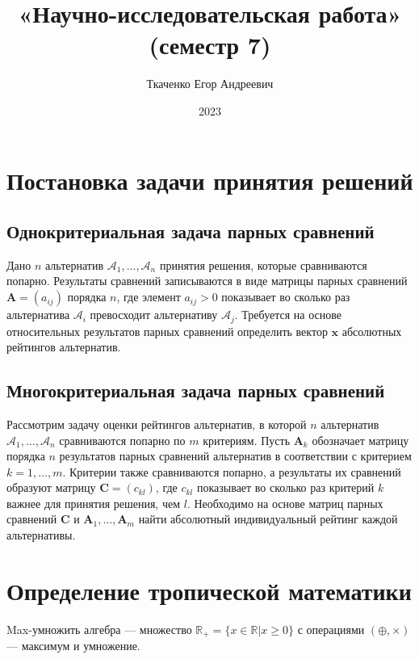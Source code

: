 \documentclass[specialist, substylefile = spbureport.rtx,
    subf,href,colorlinks=true, 12pt]{disser}
\title{«Научно-исследовательская работа» (семестр 7)}
\author{Ткаченко Егор Андреевич}
\date{2023}
\begin{document}
    \maketitle
    \pagebreak
    \tableofcontents
    \pagebreak

    \intro

    \section{Постановка задачи принятия решений}

    \subsection{Однокритериальная задача парных сравнений}
        Дано $n$ альтернатив $\mathcal{A}_{1},\ldots,\mathcal{A}_{n}$ принятия решения, которые сравниваются попарно. Результаты сравнений записываются в виде матрицы парных сравнений $\bm{A}=(a_{ij})$ порядка $n$, где элемент $a_{ij}>0$ показывает во сколько раз альтернатива $\mathcal{A}_{i}$ превосходит альтернативу $\mathcal{A}_{j}$. Требуется на основе относительных результатов парных сравнений определить вектор $\bm{x}$ абсолютных рейтингов альтернатив.\cite{Decision_making}

    \subsection{Многокритериальная задача парных сравнений}
        Рассмотрим задачу оценки рейтингов альтернатив, в которой $n$ альтернатив $\mathcal{A}_{1},\ldots,\mathcal{A}_{n}$ сравниваются попарно по $m$ критериям. Пусть $\bm{A}_{k}$ обозначает матрицу порядка $n$ результатов парных сравнений альтернатив в соответствии с критерием $k=1,\ldots,m$. Критерии также сравниваются попарно, а результаты их сравнений образуют матрицу $\bm{C}=(c_{kl})$, где $c_{kl}$ показывает во сколько раз критерий $k$ важнее для принятия решения, чем $l$. Необходимо на основе матриц парных сравнений $\bm{C}$ и $\bm{A}_{1},\ldots,\bm{A}_{m}$ найти абсолютный индивидуальный рейтинг каждой альтернативы.\cite{Decision_making}

    \section{Определение тропической математики}

        Max-умножить алгебра --- множество $\mathbb{R}_+ = \{x \in \mathbb{R} | x \geq 0\}$ с операциями $(\oplus, \times)$ --- максимум и умножение.
\end{document}
